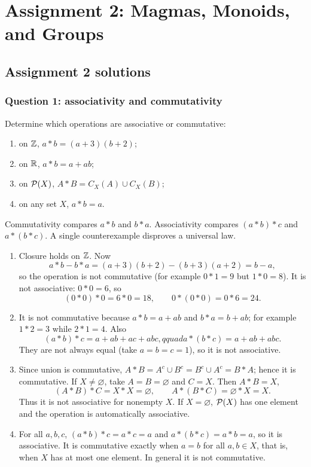 \documentclass[11pt,openany]{book}
\begin{document}
\part{Assignment 2: Magmas, Monoids, and Groups}
\chapter{Assignment 2 solutions}

\section{Question 1: associativity and commutativity}
\begin{questionbox}
Determine which operations are associative or commutative:
\begin{enumerate}[label=(\alph*)]
\item on $\mathbb Z$, $a*b=(a+3)(b+2)$;
\item on $\mathbb R$, $a*b=a+ab$;
\item on $\mathcal P(X)$, $A*B=C_X(A)\cup C_X(B)$;
\item on any set $X$, $a*b=a$.
\end{enumerate}
\end{questionbox}
\begin{approachbox}
Commutativity compares $a*b$ and $b*a$. Associativity compares $(a*b)*c$ and $a*(b*c)$. A single counterexample disproves a universal law.
\end{approachbox}
\begin{solutionbox}
\begin{enumerate}[label=(\alph*)]
\item Closure holds on $\mathbb Z$. Now
\[
a*b-b*a=(a+3)(b+2)-(b+3)(a+2)=b-a,
\]
so the operation is not commutative (for example $0*1=9$ but $1*0=8$). It is not associative: $0*0=6$, so
\[
(0*0)*0=6*0=18,
\qquad
0*(0*0)=0*6=24.
\]

\item It is not commutative because $a*b=a+ab$ and $b*a=b+ab$; for example $1*2=3$ while $2*1=4$. Also
\[
(a*b)*c=a+ab+ac+abc,qquad
a*(b*c)=a+ab+abc.
\]
They are not always equal (take $a=b=c=1$), so it is not associative.

\item Since union is commutative,
$A*B=A^c\cup B^c=B^c\cup A^c=B*A$; hence it is commutative. If $X\ne\varnothing$, take $A=B=\varnothing$ and $C=X$. Then $A*B=X$,
\[
(A*B)*C=X*X=\varnothing,
\qquad
A*(B*C)=\varnothing*X=X.
\]
Thus it is not associative for nonempty $X$. If $X=\varnothing$, $\mathcal P(X)$ has one element and the operation is automatically associative.

\item For all $a,b,c$,
$(a*b)*c=a*c=a$ and $a*(b*c)=a*b=a$, so it is associative. It is commutative exactly when $a=b$ for all $a,b\in X$, that is, when $X$ has at most one element. In general it is not commutative.
\end{enumerate}
\end{solutionbox}
\end{document}
